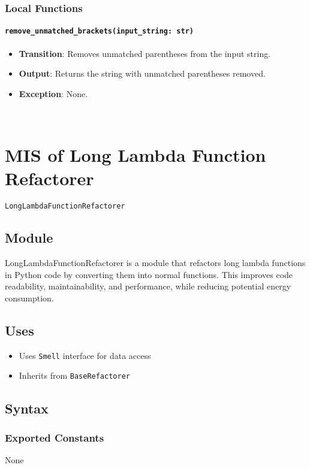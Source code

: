 \documentclass[12pt, titlepage]{article}
\begin{document}
\subsubsection{Local Functions}
\paragraph{\texttt{remove\_unmatched\_brackets(input\_string: str)}}
\begin{itemize}
\item \textbf{Transition}: Removes unmatched parentheses from the input string.
\item \textbf{Output}: Returns the string with unmatched parentheses removed.
\item \textbf{Exception}: None.
\end{itemize}

~\newpage

\section{MIS of Long Lambda Function Refactorer} \label{mis:LLF}

\texttt{LongLambdaFunctionRefactorer}

\subsection{Module}
LongLambdaFunctionRefactorer is a module that refactors 
long lambda functions in Python code by converting them into normal functions. 
This improves code readability, maintainability, and performance, while reducing potential energy consumption.

\subsection{Uses}
\begin{itemize}
  \item Uses \texttt{Smell} interface for data access
  \item Inherits from \texttt{BaseRefactorer}
\end{itemize}

\subsection{Syntax}

\subsubsection{Exported Constants}
None
\end{document}
